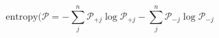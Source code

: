 \begin{equation}
\text{entropy}(\mathcal P = -\sum_j^n\mathcal P_{+j}\log\mathcal P_{+j} -\sum_j^n\mathcal P_{-j}\log\mathcal P_{-j} 
\end{equation}